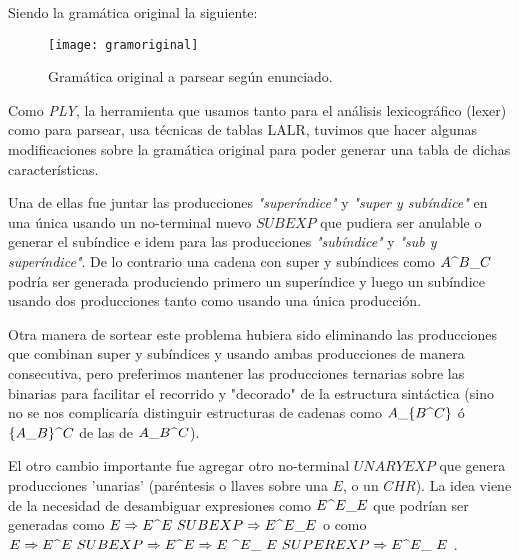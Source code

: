 Siendo la gramática original la siguiente:

\begin{figure} [ht]
    \centering
    \texttt{[image: gramoriginal]}
    \caption{Gramática original a parsear según enunciado.}
    \label{fig:gram_original}
\end{figure}

Como \emph{PLY}, la herramienta que usamos tanto para el análisis lexicográfico (lexer) como para parsear, usa técnicas de tablas LALR, tuvimos que hacer algunas modificaciones sobre la gramática original para poder generar una tabla de dichas características. \newline

Una de ellas fue juntar las producciones \emph{"superíndice"} y \emph{"super y subíndice"} en una única usando un no-terminal nuevo $SUBEXP$ que pudiera ser anulable o generar el subíndice e idem para las producciones \emph{"subíndice"} y \emph{"sub y superíndice"}. De lo contrario una cadena con super y subíndices  como $A\super B\sub C$ podría ser generada produciendo primero un superíndice y luego un subíndice usando dos producciones tanto como usando una única producción. \newline

Otra manera de sortear este problema hubiera sido eliminando las producciones que combinan super y subíndices y usando ambas producciones de manera consecutiva, pero preferimos mantener las producciones ternarias sobre las binarias para facilitar el recorrido y "decorado" de la estructura sintáctica (sino no se nos complicaría distinguir estructuras de cadenas como $ A\sub \{B\super C\} $ ó $\{A\sub B\}\super C$ de las de $A\sub B\super C$). \newline

El otro cambio importante fue agregar otro no-terminal $UNARYEXP$ que genera producciones 'unarias' (paréntesis o llaves sobre una $E$, o un $CHR$). La idea viene de la necesidad de desambiguar expresiones como $E\super E\sub E$ que podrían ser generadas como $E \Rightarrow E \super  E\ SUBEXP \Rightarrow E\super E\sub E$ o como $E \Rightarrow  E \super  E\ SUBEXP \Rightarrow E \super  E \Rightarrow E\ \super  E\sub \ E\ SUPEREXP \Rightarrow E \super  E\sub \ E\ $. \newline

